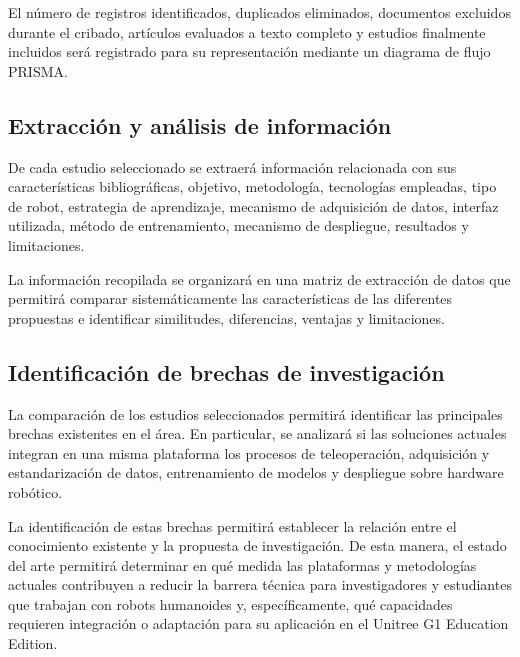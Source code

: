 \documentclass[stu,12pt,floatsintext]{apa7}
\begin{document}
El número de registros identificados, duplicados eliminados, documentos excluidos durante el cribado, artículos evaluados a texto completo y estudios finalmente incluidos será registrado para su representación mediante un diagrama de flujo PRISMA.

\subsection{Extracción y análisis de información}

De cada estudio seleccionado se extraerá información relacionada con sus características bibliográficas, objetivo, metodología, tecnologías empleadas, tipo de robot, estrategia de aprendizaje, mecanismo de adquisición de datos, interfaz utilizada, método de entrenamiento, mecanismo de despliegue, resultados y limitaciones.

La información recopilada se organizará en una matriz de extracción de datos que permitirá comparar sistemáticamente las características de las diferentes propuestas e identificar similitudes, diferencias, ventajas y limitaciones.

\subsection{Identificación de brechas de investigación}

La comparación de los estudios seleccionados permitirá identificar las principales brechas existentes en el área. En particular, se analizará si las soluciones actuales integran en una misma plataforma los procesos de teleoperación, adquisición y estandarización de datos, entrenamiento de modelos y despliegue sobre hardware robótico.

La identificación de estas brechas permitirá establecer la relación entre el conocimiento existente y la propuesta de investigación. De esta manera, el estado del arte permitirá determinar en qué medida las plataformas y metodologías actuales contribuyen a reducir la barrera técnica para investigadores y estudiantes que trabajan con robots humanoides y, específicamente, qué capacidades requieren integración o adaptación para su aplicación en el Unitree G1 Education Edition.


\end{document}
